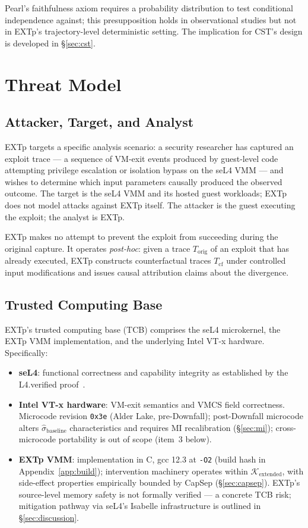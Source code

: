\documentclass[conference]{IEEEtran}
\newcommand{\Korig}{T_\text{orig}}
\newcommand{\Tcf}{T_\text{cf}}
\newcommand{\Kextended}{\mathcal{K}_\text{extended}}
\newcommand{\sigbase}{\hat{\sigma}_\text{baseline}}
\begin{document}
Pearl's faithfulness axiom requires a probability distribution to
test conditional independence against; this presupposition holds in
observational studies but not in EXTp's trajectory-level
deterministic setting. The implication for CST's design is developed
in \S\ref{sec:cst}.

\section{Threat Model}\label{sec:threat}

\subsection*{Attacker, Target, and Analyst}

EXTp targets a specific analysis scenario: a security researcher has
captured an exploit trace --- a sequence of VM-exit events produced
by guest-level code attempting privilege escalation or isolation
bypass on the seL4 VMM --- and wishes to determine which input
parameters causally produced the observed outcome. The target is the
seL4 VMM and its hosted guest workloads; EXTp does not model attacks
against EXTp itself. The attacker is the guest executing the
exploit; the analyst is EXTp.

EXTp makes no attempt to prevent the exploit from succeeding during
the original capture. It operates \emph{post-hoc}: given a trace
$\Korig$ of an exploit that has already executed, EXTp constructs
counterfactual traces $\Tcf$ under controlled input modifications and
issues causal attribution claims about the divergence.

\subsection*{Trusted Computing Base}

EXTp's trusted computing base (TCB) comprises the seL4 microkernel,
the EXTp VMM implementation, and the underlying Intel VT-x hardware.
Specifically:
\begin{itemize}
\item \textbf{seL4}: functional correctness and capability integrity
  as established by the L4.verified
  proof~\cite{klein2009sel4,klein2014sel4}.
\item \textbf{Intel VT-x hardware}: VM-exit semantics and VMCS field
  correctness. Microcode revision \texttt{0x3e} (Alder Lake,
  pre-Downfall); post-Downfall microcode alters $\sigbase$
  characteristics and requires MI recalibration (\S\ref{sec:mi});
  cross-microcode portability is out of scope (item~3 below).
\item \textbf{EXTp VMM}: implementation in C, gcc 12.3 at
  \texttt{-O2} (build hash in Appendix~\ref{app:build}); intervention
  machinery operates within $\Kextended$, with side-effect properties
  empirically bounded by CapSep (\S\ref{sec:capsep}). EXTp's
  source-level memory safety is not formally verified --- a concrete
  TCB risk; mitigation pathway via seL4's Isabelle infrastructure is
  outlined in \S\ref{sec:discussion}.
\end{itemize}
\end{document}
